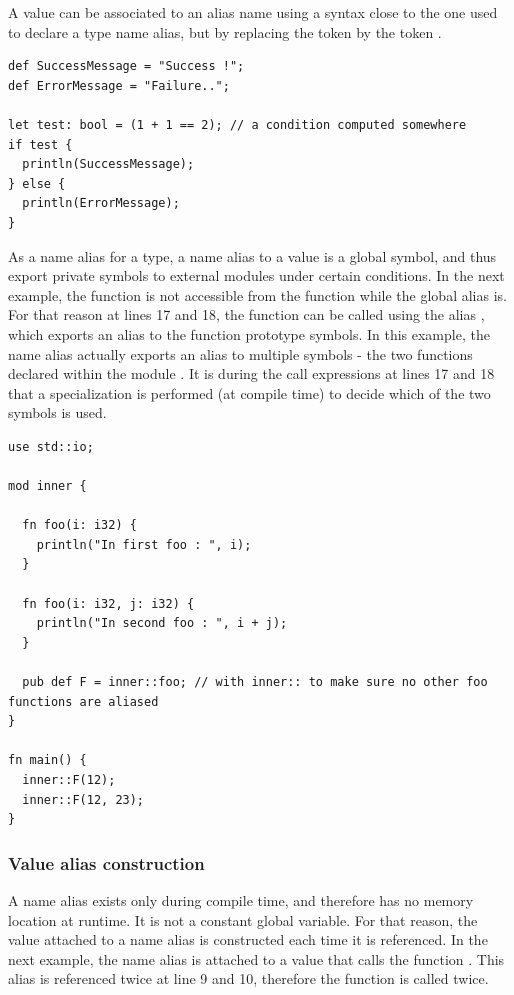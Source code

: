 A value can be associated to an alias name using a syntax close to the one used
to declare a type name alias, but by replacing the token \token{:} by the token
\token{=}.

\begin{lstlisting}[style=coloredverbatim]
def SuccessMessage = "Success !";
def ErrorMessage = "Failure..";

let test: bool = (1 + 1 == 2); // a condition computed somewhere
if test {
  println(SuccessMessage);
} else {
  println(ErrorMessage);
}
\end{lstlisting}

As a name alias for a type, a name alias to a value is a global symbol, and thus
export private symbols to external modules under certain
conditions. In the next example, the function  is not accessible from
the  function while the global alias  is. For that
reason at lines 17 and 18, the function  can be called using the alias
, which exports an alias to the function prototype symbols. In this
example, the name alias actually exports an alias to multiple symbols - the two
functions  declared within the module . It is during the
call expressions at lines 17 and 18 that a specialization is performed (at
compile time) to decide which of the two symbols is used.

\begin{lstlisting}[style=coloredverbatim]
use std::io;

mod inner {

  fn foo(i: i32) {
    println("In first foo : ", i);
  }

  fn foo(i: i32, j: i32) {
    println("In second foo : ", i + j);
  }

  pub def F = inner::foo; // with inner:: to make sure no other foo functions are aliased
}

fn main() {
  inner::F(12);
  inner::F(12, 23);
}
\end{lstlisting}

\subsubsection*{Value alias construction}

A name alias exists only during compile time, and therefore has no memory
location at runtime. It is not a constant global variable. For that reason, the
value attached to a name alias is constructed each time it is referenced. In the
next example, the name alias  is attached to a value that calls the
function . This alias is referenced twice at line 9 and 10, therefore
the function  is called twice.

